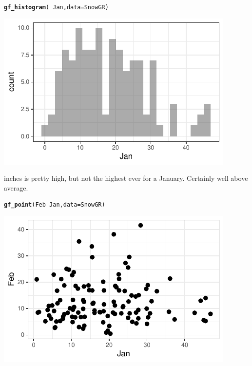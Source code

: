 \documentclass[twoside]{book}\usepackage[]{graphicx}\usepackage[]{xcolor}
\makeatletter
\def\maxwidth{ %
  \ifdim\Gin@nat@width>\linewidth
    \linewidth
  \else
    \Gin@nat@width
  \fi
}
\newcommand{\hlopt}[1]{\textcolor[rgb]{0,0,0}{#1}}%
\newcommand{\hlstd}[1]{\textcolor[rgb]{0.345,0.345,0.345}{#1}}%
\newcommand{\hlkwc}[1]{\textcolor[rgb]{0.333,0.667,0.333}{#1}}%
\newcommand{\hlkwd}[1]{\textcolor[rgb]{0.737,0.353,0.396}{\textbf{#1}}}%
\newenvironment{kframe}{%
 \def\at@end@of@kframe{}%
 \ifinner\ifhmode%
  \def\at@end@of@kframe{\end{minipage}}%
  \begin{minipage}{\columnwidth}%
 \fi\fi%
 \def\FrameCommand##1{\hskip\@totalleftmargin \hskip-\fboxsep
 \colorbox{shadecolor}{##1}\hskip-\fboxsep
     \hskip-\linewidth \hskip-\@totalleftmargin \hskip\columnwidth}%
 \MakeFramed {\advance\hsize-\width
   \@totalleftmargin\z@ \linewidth\hsize
   \@setminipage}}%
 {\par\unskip\endMakeFramed%
 \at@end@of@kframe}
\newenvironment{knitrout}{}{} %
\makeatother
\begin{document}
\begin{solution}
\begin{knitrout}
\color{fgcolor}\begin{kframe}
\begin{alltt}
\hlkwd{gf_histogram}\hlstd{(} \hlopt{~} \hlstd{Jan,} \hlkwc{data} \hlstd{= SnowGR)}
\end{alltt}


{\ttfamily\noindent\color{warningcolor}{\#\# Warning: Removed 1 rows containing non-finite values (stat\_bin).}}\end{kframe}

{\centering \includegraphics[width=\maxwidth]{figures/fig-unnamed-chunk-30-1} 

}



\end{knitrout}
36.6 inches is pretty high, but not the highest ever for a January.  Certainly well above average.

\begin{knitrout}
\color{fgcolor}\begin{kframe}
\begin{alltt}
\hlkwd{gf_point}\hlstd{(Feb} \hlopt{~} \hlstd{Jan,} \hlkwc{data} \hlstd{= SnowGR)}
\end{alltt}


{\ttfamily\noindent\color{warningcolor}{\#\# Warning: Removed 2 rows containing missing values (geom\_point).}}\end{kframe}

{\centering \includegraphics[width=\maxwidth]{figures/fig-unnamed-chunk-31-1} 

}
\end{knitrout}
\end{solution}
\end{document}
